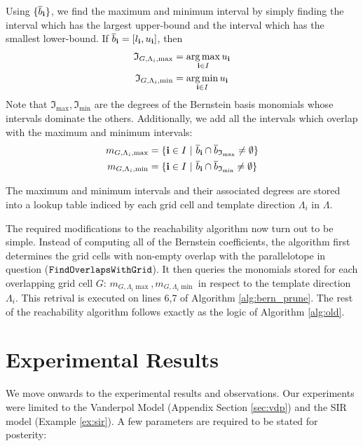 \begin{enumerate}
 Using $\{\overline{b}_{{\bf i}}\}$, we find the maximum and minimum interval by simply finding the interval which has the largest upper-bound and the interval which has the smallest lower-bound. If $\overline{b}_{{\bf i}} = [l_{\bf i}, u_{\bf i}]$, then
%
\begin{align}
  \mathfrak{I}_{G,\Lambda_i, \max} & = \operatorname*{arg\,max}_{{\bf i} \in I} u_{\bf i} \\
  \mathfrak{I}_{G,\Lambda_i, \min} & = \operatorname*{arg\,min}_{{\bf i} \in I} u_{\bf i}
\end{align}
%
Note that $\mathfrak{I}_{\max}, \mathfrak{I}_{\min}$ are the degrees of the Bernstein basis monomials whose intervals dominate the others. Additionally, we add all the intervals which overlap with the maximum and minimum intervals:
%
\begin{align}
  \begin{split}
      m_{G,\Lambda_i,\max} & = \{{\bf i} \in I ~|~ \overline{b}_{{\bf i}} \cap \overline{b}_{\mathfrak{I}_{\max}} \neq \emptyset \}\\
      m_{G,\Lambda_i,\min} & = \{{\bf i} \in I ~|~ \overline{b}_{{\bf i}} \cap \overline{b}_{\mathfrak{I}_{\min}} \neq \emptyset \}
  \end{split}
\end{align}

 The maximum and minimum intervals and their associated degrees are stored into a lookup table indiced by each grid cell and template direction $\Lambda_i$ in $\Lambda$.
\end{enumerate}

The required modifications to the reachability algorithm now turn out to be simple. Instead of computing all of the Bernstein coefficients, the algorithm first determines the grid cells with non-empty overlap with the parallelotope in question ($\texttt{FindOverlapsWithGrid}$). It then queries the monomials stored for each overlapping grid cell $G$: $ m_{G,\Lambda_i\max}, m_{G,\Lambda_i \min}$ in respect to the template direction $\Lambda_i$. This retrival is executed on lines 6,7 of Algorithm \ref{alg:bern_prune}. The rest of the reachability algorithm follows exactly as the logic of Algorithm \ref{alg:old}.

\section{Experimental Results}
We move onwards to the experimental results and observations. Our experiments were limited to the Vanderpol Model (Appendix Section \ref{sec:vdp}) and the SIR model (Example \ref{ex:sir}). A few parameters are required to be stated for posterity:

